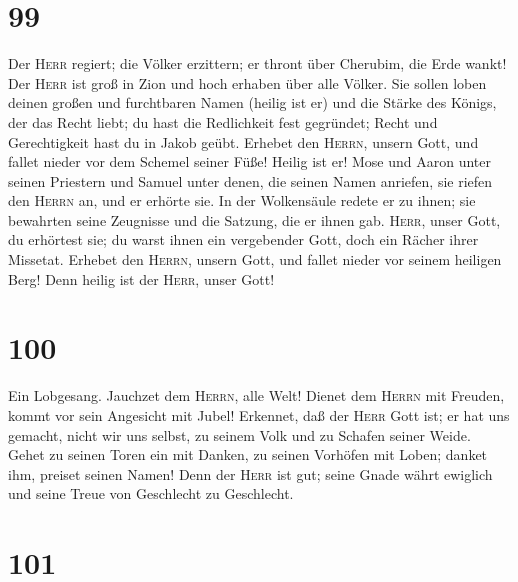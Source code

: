 \hypertarget{section-98}{%
\section{99}\label{section-98}}

 Der \textsc{Herr} regiert; die Völker erzittern; er
thront über Cherubim, die Erde wankt!  Der \textsc{Herr}
ist groß in Zion und hoch erhaben über alle Völker.  Sie
sollen loben deinen großen und furchtbaren Namen (heilig ist er)
 und die Stärke des Königs, der das Recht liebt; du hast
die Redlichkeit fest gegründet; Recht und Gerechtigkeit hast du in Jakob
geübt.  Erhebet den \textsc{Herrn}, unsern Gott, und
fallet nieder vor dem Schemel seiner Füße! Heilig ist er! 
Mose und Aaron unter seinen Priestern und Samuel unter denen, die seinen
Namen anriefen, sie riefen den \textsc{Herrn} an, und er erhörte sie.
 In der Wolkensäule redete er zu ihnen; sie bewahrten
seine Zeugnisse und die Satzung, die er ihnen gab. 
\textsc{Herr}, unser Gott, du erhörtest sie; du warst ihnen ein
vergebender Gott, doch ein Rächer ihrer Missetat.  Erhebet
den \textsc{Herrn}, unsern Gott, und fallet nieder vor seinem heiligen
Berg! Denn heilig ist der \textsc{Herr}, unser Gott!

\hypertarget{section-99}{%
\section{100}\label{section-99}}

 Ein Lobgesang. Jauchzet dem \textsc{Herrn}, alle Welt!
 Dienet dem \textsc{Herrn} mit Freuden, kommt vor sein
Angesicht mit Jubel!  Erkennet, daß der \textsc{Herr} Gott
ist; er hat uns gemacht, nicht wir uns selbst, zu seinem Volk und zu
Schafen seiner Weide.  Gehet zu seinen Toren ein mit
Danken, zu seinen Vorhöfen mit Loben; danket ihm, preiset seinen Namen!
 Denn der \textsc{Herr} ist gut; seine Gnade währt
ewiglich und seine Treue von Geschlecht zu Geschlecht.

\hypertarget{section-100}{%
\section{101}\label{section-100}}

